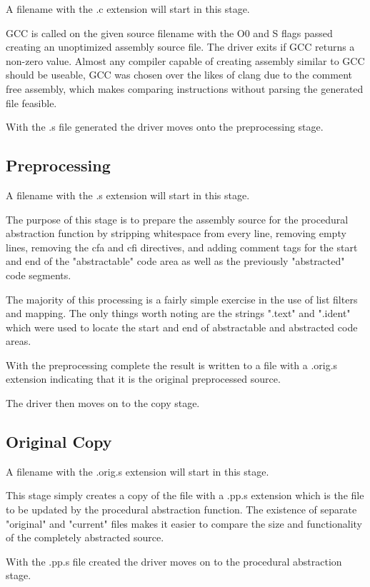 \documentclass[9pt,nocopyrightspace]{sigplanconf}
\begin{document}
A filename with the .c extension will start in this stage.

GCC is called on the given source filename with the O0 and S flags passed creating an unoptimized assembly source file.
The driver exits if GCC returns a non-zero value.
Almost any compiler capable of creating assembly similar to GCC should be useable, GCC was chosen over the likes of clang due to the comment free assembly, which makes comparing instructions without parsing the generated file feasible.

With the .s file generated the driver moves onto the preprocessing stage.

\subsection{Preprocessing}

A filename with the .s extension will start in this stage.

The purpose of this stage is to prepare the assembly source for the procedural abstraction function by stripping whitespace from every line, removing empty lines, removing the cfa and cfi directives, and adding comment tags for the start and end of the "abstractable" code area as well as the previously "abstracted" code segments.

The majority of this processing is a fairly simple exercise in the use of list filters and mapping.
The only things worth noting are the strings ".text" and ".ident" which were used to locate the start and end of abstractable and abstracted code areas.

With the preprocessing complete the result is written to a file with a .orig.s extension indicating that it is the original preprocessed source.

The driver then moves on to the copy stage.

\subsection{Original Copy}

A filename with the .orig.s extension will start in this stage.

This stage simply creates a copy of the file with a .pp.s extension which is the file to be updated by the procedural abstraction function.
The existence of separate "original" and "current" files makes it easier to compare the size and functionality of the completely abstracted source.

With the .pp.s file created the driver moves on to the procedural abstraction stage.
\end{document}
